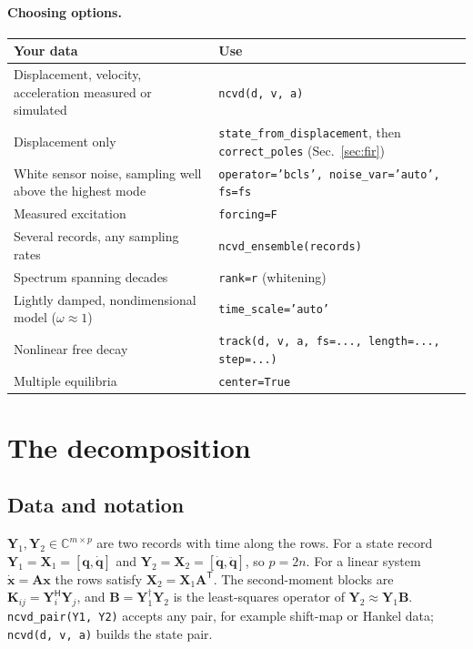 \documentclass[report]{nld}
\theoremstyle{remark}\newtheorem*{remark}{Remark}
\newcommand{\B}{\mathbf{B}}
\newcommand{\Y}{\mathbf{Y}}
\newcommand{\X}{\mathbf{X}}
\newcommand{\K}{\mathbf{K}}
\renewcommand{\H}{\mathsf{H}}
\newcommand{\code}[1]{\texttt{#1}}
\begin{document}
\paragraph{Choosing options.}
\begin{center}\small
\begin{tabularx}{\linewidth}{@{}>{\raggedright}p{5.2cm}X@{}}
\toprule
Your data & Use\\
\midrule
Displacement, velocity, acceleration measured or simulated & \code{ncvd(d, v, a)}\\
Displacement only & \code{state\_from\_displacement}, then \code{correct\_poles} (Sec.~\ref{sec:fir})\\
White sensor noise, sampling well above the highest mode & \code{operator='bcls', noise\_var='auto', fs=fs}\\
Measured excitation & \code{forcing=F}\\
Several records, any sampling rates & \code{ncvd\_ensemble(records)}\\
Spectrum spanning decades & \code{rank=r} (whitening)\\
Lightly damped, nondimensional model ($\omega\approx1$) & \code{time\_scale='auto'}\\
Nonlinear free decay & \code{track(d, v, a, fs=..., length=..., step=...)}\\
Multiple equilibria & \code{center=True}\\
\bottomrule
\end{tabularx}
\end{center}

\section{The decomposition}\label{sec:decomposition}

\subsection{Data and notation}

$\Y_1,\Y_2\in\mathbb{C}^{m\times p}$ are two records with time along the rows.
For a state record $\Y_1=\X_1=[\mathbf{q},\dot{\mathbf{q}}]$ and
$\Y_2=\X_2=[\dot{\mathbf{q}},\ddot{\mathbf{q}}]$, so $p=2n$. For a linear
system $\dot{\mathbf{x}}=\mathbf{A}\mathbf{x}$ the rows satisfy
$\X_2=\X_1\mathbf{A}^{\mathsf T}$. The second-moment blocks are
$\K_{ij}=\Y_i^\H\Y_j$, and $\B=\Y_1^{\dagger}\Y_2$ is the least-squares
operator of $\Y_2\approx\Y_1\B$. \code{ncvd\_pair(Y1, Y2)} accepts any pair, for
example shift-map or Hankel data; \code{ncvd(d, v, a)} builds the state pair.
\end{document}
